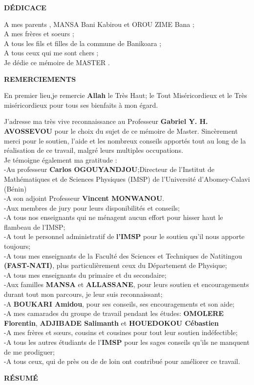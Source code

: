 \documentclass[12pt,a4paper, openany]{article}
\begin{document}
	\begin{center}
		\textbf{D\'{E}DICACE}
	\end{center}
	
	A mes parents , MANSA Bani Kabirou et OROU ZIME Bana ;\\
A mes frères et soeurs ;\\
A tous les fils et filles de la commune de Banikoara ;\\
A tous ceux qui me sont chers ; \\
Je dédie ce mémoire de MASTER .
\newpage
 
 \begin{center}
 	\textbf{REMERCIEMENTS}
 \end{center}
 En premier lieu,je remercie {\bfseries Allah} le Très Haut; le Tout Miséricordieux et le Très miséricordieux pour tous ses bienfaits à mon égard. \par
 J'adresse ma très vive reconnaissance au Professeur {\bfseries Gabriel Y. H. AVOSSEVOU} pour le choix du sujet de ce mémoire de Master. Sincèrement merci pour le soutien, l'aide et les nombreux conseils apportés tout au long de la réalisation de ce travail, malgré leurs multiples occupations.\\Je témoigne également ma gratitude :\\-Au professeur {\bfseries Carlos  OGOUYANDJOU};Directeur de l'Institut de Mathématiques et de Sciences  Physiques  (IMSP) de l'Université d'Abomey-Calavi  (Bénin)\\-A son adjoint Professeur {\bfseries Vincent  MONWANOU}.\\-Aux membres de jury pour leurs disponibilités et conseils;\\-A tous nos enseignants qui ne ménagent aucun effort pour hisser haut le flambeau de l'IMSP;\\-A tout le personnel administratif de {\bfseries  l'IMSP} pour le soutien qu'il nous apporte toujours;\\-A tous mes enseignants  de la Faculté des Sciences et Techniques de Natitingou  {\bfseries(FAST-NATI)}, plus particulièrement ceux du Département de Physique;\\-A tous mes enseignants du primaire et du secondaire;\\-Aux familles {\bfseries MANSA}  et {\bfseries ALLASSANE}, pour leurs soutien et encouragements durant tout mon parcours, je leur suis reconnaissant;\\-A {\bfseries BOUKARI Amidou}, pour ses conseils, ses encouragements et son aide;\\-A mes camarades du groupe de travail pendant les études: {\bfseries OMOLERE Florentin}, {\bfseries ADJIBADE Salimanth} et {\bfseries HOUEDOKOU Cébastien}\\-A mes frères et s\oe{}urs, cousins et cousines pour tout leur soutien indéfectible;\\-A tous les autres étudiants de l'{\bfseries IMSP} pour les sages conseils qu'ils ne manquent de me prodiguer;\\-A tous ceux, qui de près ou de de loin ont contribué pour améliorer ce travail.
 \newpage
 \begin{center}
  \textbf{R\'{E}SUM\'{E}}
 \end{center}
 
\end{document}
